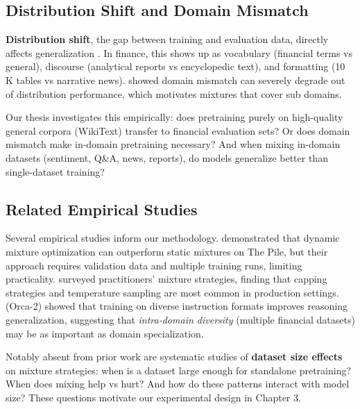 \subsection{Distribution Shift and Domain Mismatch}

\textbf{Distribution shift}, the gap between training and evaluation data, directly affects generalization \parencite{quinonero2009dataset}. In finance, this shows up as vocabulary (financial terms vs general), discourse (analytical reports vs encyclopedic text), and formatting (10 K tables vs narrative news). \textcite{aharoni2020unsupervised} showed domain mismatch can severely degrade out of distribution performance, which motivates mixtures that cover sub domains.

Our thesis investigates this empirically: does pretraining purely on high-quality general corpora (WikiText) transfer to financial evaluation sets? Or does domain mismatch make in-domain pretraining necessary? And when mixing in-domain datasets (sentiment, Q\&A, news, reports), do models generalize better than single-dataset training?

\subsection{Related Empirical Studies}

Several empirical studies inform our methodology. \textcite{xie2023doremi} demonstrated that dynamic mixture optimization can outperform static mixtures on The Pile, but their approach requires validation data and multiple training runs, limiting practicality. \textcite{longpre2023pretrainer} surveyed practitioners' mixture strategies, finding that capping strategies and temperature sampling are most common in production settings. \textcite{mitra2023orca2} (Orca-2) showed that training on diverse instruction formats improves reasoning generalization, suggesting that \textit{intra-domain diversity} (multiple financial datasets) may be as important as domain specialization.

Notably absent from prior work are systematic studies of \textbf{dataset size effects} on mixture strategies: when is a dataset large enough for standalone pretraining? When does mixing help vs hurt? And how do these patterns interact with model size? These questions motivate our experimental design in Chapter 3.
